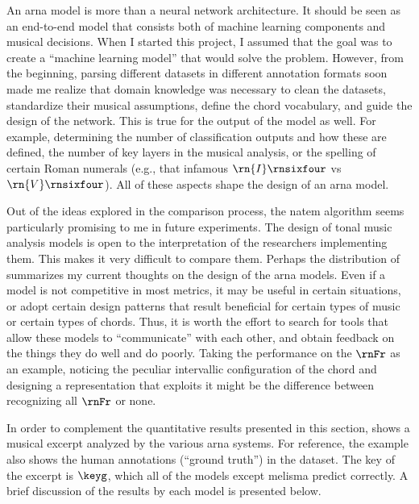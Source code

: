 
An \gls{arna} model is more than a neural network
architecture. It should be seen as an end-to-end model that
consists both of machine learning components and musical
decisions. When I started this project, I assumed that the
goal was to create a ``machine learning model'' that would
solve the problem. However, from the beginning, parsing
different datasets in different annotation formats soon made
me realize that domain knowledge was necessary to clean the
datasets, standardize their musical assumptions, define the
chord vocabulary, and guide the design of the network. This
is true for the output of the model as well. For example,
determining the number of classification outputs and how
these are defined, the number of key layers in the musical
analysis, or the spelling of certain Roman numerals (e.g.,
that infamous $\rn{I}\rnsixfour$ vs $\rn{V}\rnsixfour$). All
of these aspects shape the design of an \gls{arna} model.

Out of the ideas explored in the comparison process, the
\gls{natem} algorithm seems particularly promising to me in
future experiments. The design of tonal music analysis
models is open to the interpretation of the researchers
implementing them. This makes it very difficult to compare
them. Perhaps the distribution of 
summarizes my current thoughts on the design of the
\gls{arna} models. Even if a model is not competitive in
most metrics, it may be useful in certain situations, or
adopt certain design patterns that result beneficial for
certain types of music or certain types of chords. Thus, it
is worth the effort to search for tools that allow these
models to ``communicate'' with each other, and obtain
feedback on the things they do well and do poorly. Taking
the performance on the $\rnFr$ as an example, noticing the
peculiar intervallic configuration of the chord and
designing a representation that exploits it might be the
difference between recognizing all $\rnFr$ or none. 


In order to complement the quantitative results presented in
this section,  shows a musical
excerpt analyzed by the various \gls{arna} systems. For
reference, the example also shows the human annotations
(``ground truth'') in the dataset. The key of the excerpt is
$\keyg$, which all of the models except \gls{melisma}
predict correctly. A brief discussion of the results by each
model is presented below. 

